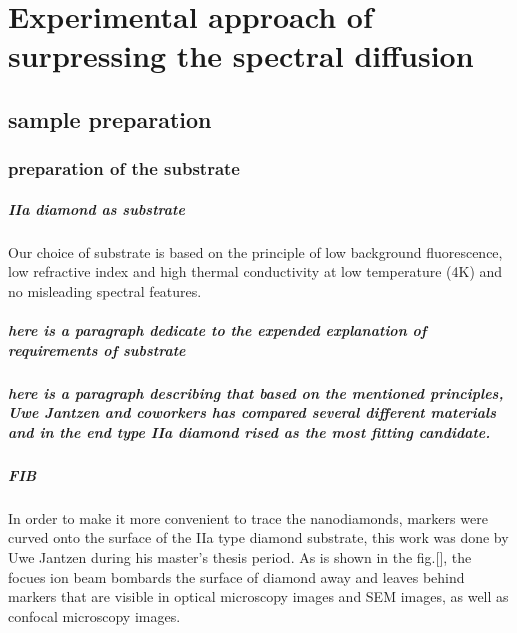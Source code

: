 \chapter[Experimental approach of surpressing the spectral diffusion]{Experimental approach of surpressing the spectral diffusion} %

\label{Chapter2} %


\section[sample preparation]{sample preparation}
\subsection{preparation of the substrate}
\paragraph{IIa diamond as substrate}

Our choice of substrate is based on the principle of low background fluorescence, low refractive index and high thermal conductivity at low temperature (4K) and no misleading spectral features.

\paragraph{here is a paragraph dedicate to the expended explanation of requirements of substrate} 
\paragraph{here is a paragraph describing that based on the mentioned principles, Uwe Jantzen and coworkers has compared several different materials and in the end type IIa diamond rised as the most fitting candidate.}
\paragraph{FIB}
In order to make it more convenient to trace the nanodiamonds, markers were curved onto the surface of the IIa type diamond substrate, this work was done by Uwe Jantzen during his master's thesis period. As is shown in the fig.[], the focues ion beam bombards the surface of diamond away and leaves behind markers that are visible in optical microscopy images and SEM images, as well as confocal microscopy images.
